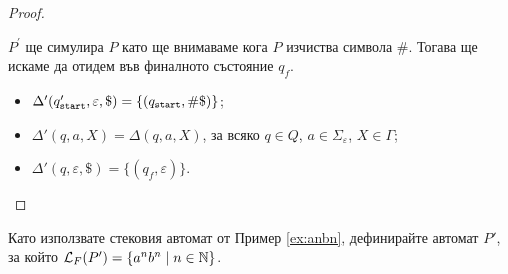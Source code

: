 \begin{proof}
\begin{enumerate}[1)]
    $P^\prime$ ще симулира $P$ като ще внимаваме кога $P$ изчиства символа $\#$. Тогава ще искаме да отидем във финалното състояние $q_f$.
    \begin{itemize}
    \item 
      $\Delta'(q_{\texttt{start}}',\varepsilon,\$) = \{(q_{\texttt{start}}, \#\$)\}$;
    \item
      $\Delta'(q,a,X) = \Delta(q,a,X)$, за всяко $q \in Q$, $a \in \Sigma_\varepsilon$, $X \in \Gamma$;
    \item
      $\Delta'(q,\varepsilon,\$) = \{(q_f,\varepsilon)\}$.
    \end{itemize}
  \end{enumerate}
\end{proof}

\begin{problem}
  Като използвате стековия автомат от Пример \ref{ex:anbn}, дефинирайте автомат $P'$, за който
  $\mathcal{L}_F(P') = \{a^nb^n \mid n\in\mathbb{N}\}$.
\end{problem}

